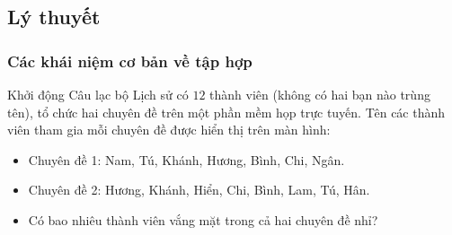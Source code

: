 

\subsection{Lý thuyết}
\subsubsection{Các khái niệm cơ bản về tập hợp}
\begin{hoatdong}{Khởi động}
	Câu lạc bộ Lịch sử có $12$ thành viên (không có hai bạn nào trùng tên), tổ chức hai chuyên đề trên một phần mềm họp trực tuyến. Tên các thành viên tham gia mỗi chuyên đề được hiển thị trên màn hình:
	\begin{itemize}
		\item Chuyên đề 1: Nam, Tú, Khánh, Hương, Bình, Chi, Ngân.
		\item Chuyên đề 2: Hương, Khánh, Hiển, Chi, Bình, Lam, Tú, Hân.
		\item Có bao nhiêu thành viên vắng mặt trong cả hai chuyên đề nhỉ?
	\end{itemize}
\end{hoatdong}

